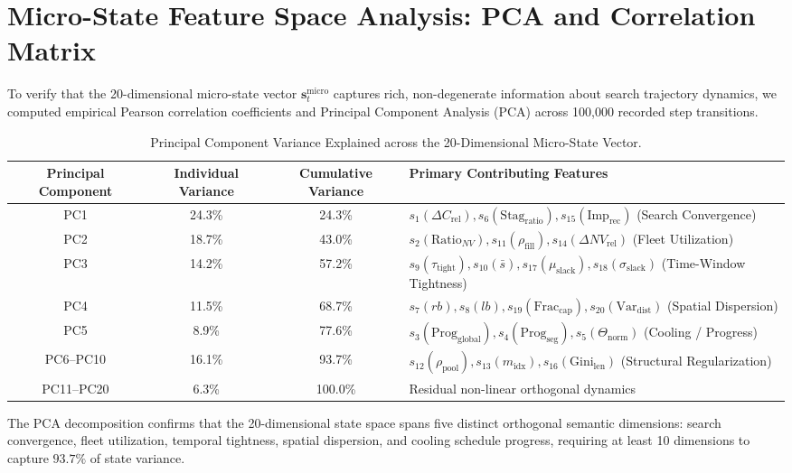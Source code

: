 \documentclass{article}
\begin{document}
\section{Micro-State Feature Space Analysis: PCA and Correlation Matrix}
\label{sec:supp_feature_analysis}

To verify that the 20-dimensional micro-state vector $\mathbf{s}_t^{\text{micro}}$ captures rich, non-degenerate information about search trajectory dynamics, we computed empirical Pearson correlation coefficients and Principal Component Analysis (PCA) across 100,000 recorded step transitions.

\begin{table}[!htbp]
\caption{Principal Component Variance Explained across the 20-Dimensional Micro-State Vector.}
\label{tab:supp_pca}
\centering
\small
\begin{tabularx}{\textwidth}{c c c X}
\toprule
\textbf{Principal Component} & \textbf{Individual Variance} & \textbf{Cumulative Variance} & \textbf{Primary Contributing Features} \\
\midrule
PC1 & 24.3\% & 24.3\% & $s_1 (\Delta C_{\text{rel}}), s_6 (\text{Stag}_{\text{ratio}}), s_{15} (\text{Imp}_{\text{rec}})$ (Search Convergence) \\
PC2 & 18.7\% & 43.0\% & $s_2 (\text{Ratio}_{NV}), s_{11} (\rho_{\text{fill}}), s_{14} (\Delta NV_{\text{rel}})$ (Fleet Utilization) \\
PC3 & 14.2\% & 57.2\% & $s_9 (\tau_{\text{tight}}), s_{10} (\bar{s}), s_{17} (\mu_{\text{slack}}), s_{18} (\sigma_{\text{slack}})$ (Time-Window Tightness) \\
PC4 & 11.5\% & 68.7\% & $s_7 (rb), s_8 (lb), s_{19} (\text{Frac}_{\text{cap}}), s_{20} (\text{Var}_{\text{dist}})$ (Spatial Dispersion) \\
PC5 & 8.9\% & 77.6\% & $s_3 (\text{Prog}_{\text{global}}), s_4 (\text{Prog}_{\text{seg}}), s_5 (\Theta_{\text{norm}})$ (Cooling / Progress) \\
PC6--PC10 & 16.1\% & 93.7\% & $s_{12} (\rho_{\text{pool}}), s_{13} (m_{\text{idx}}), s_{16} (\text{Gini}_{\text{len}})$ (Structural Regularization) \\
PC11--PC20 & 6.3\% & 100.0\% & Residual non-linear orthogonal dynamics \\
\bottomrule
\end{tabularx}
\end{table}

The PCA decomposition confirms that the 20-dimensional state space spans five distinct orthogonal semantic dimensions: search convergence, fleet utilization, temporal tightness, spatial dispersion, and cooling schedule progress, requiring at least 10 dimensions to capture $93.7\%$ of state variance.
\end{document}
